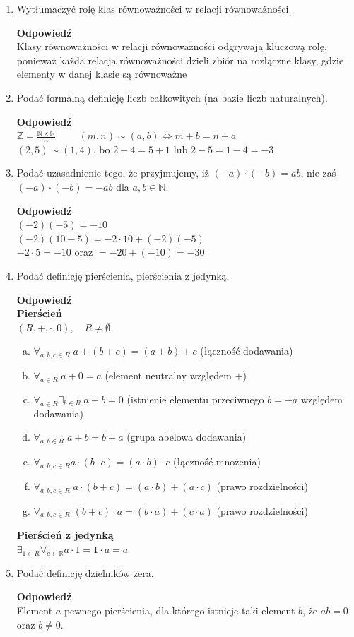 \documentclass[12pt,a4paper]{article}
\theoremstyle{break}
\newcommand{\Odp}[1]{
		\begin{mdframed}[style=zadanie]
			\textbf{Odpowiedź}\\
			#1
		\end{mdframed}
	}
\begin{document}
\begin{enumerate}[1.]
	\item Wytłumaczyć rolę klas równoważności w relacji równoważności.
	\Odp{
	Klasy równoważności w relacji równoważności odgrywają kluczową rolę, ponieważ każda relacja równoważności dzieli zbiór na rozłączne klasy, gdzie elementy w danej klasie są równoważne
	}
	
	\item Podać formalną definicję liczb całkowitych (na bazie liczb naturalnych).
	\Odp{
	$\mathbb{Z}=\frac{\mathbb{N}\times\mathbb{N}}{\sim} \qquad$
	$(m,n)\sim (a,b) \Leftrightarrow m+b = n+a$\\
	$(2,5)\sim (1,4)$, bo $2+4=5+1$ lub $2-5=1-4=-3$
	}
	
	\item Podać uzasadnienie tego, że przyjmujemy, iż $(-a)\cdot(-b) = ab$, nie zaś $(-a)\cdot(-b) = -ab$ dla $a, b \in \mathbb{N}$.
	\Odp{
	$(-2)(-5)=-10$\\
	$(-2)(10-5)=-2\cdot10+(-2)(-5)$\\
	$-2\cdot5=-10$ oraz $=-20+(-10)=-30$
	}
	
	\item Podać definicję pierścienia, pierścienia z jedynką.
	\Odp{
		\textbf{Pierścień}\\
		$(R,+,\cdot,0), \quad R\neq\emptyset$
		\begin{enumerate}[a)]
			\item $\forall_{a,b,c\in R}\; a+(b+c)=(a+b)+c$ (łączność dodawania)
			\item $\forall_{a\in R}\; a+0=a$ (element neutralny względem $+$)
			\item $\forall_{a\in R} \exists_{b\in R}\; a+b=0$ (istnienie elementu przeciwnego $b=-a$ względem dodawania)
			\item $\forall_{a,b\in R}\; a+b=b+a$ (grupa abelowa dodawania)
			\item $\forall_{a,b,c\in R} a\cdot(b\cdot c)=(a\cdot b)\cdot c$ (łączność mnożenia)
			\item $\forall_{a,b,c\in R} \; a\cdot(b+c)=(a\cdot b)+ (a\cdot c)$ (prawo rozdzielności)
			\item $\forall_{a,b,c\in R} \; (b+c)\cdot a= (b\cdot a) + (c\cdot a)$ (prawo rozdzielności)
		\end{enumerate}
		
		\textbf{Pierścień z jedynką}\\
		$\exists_{1\in R} \forall_{a\in\mathbb{R}} a\cdot1=1\cdot a=a$
	}
	
	\item Podać definicję dzielników zera.
	\Odp{
		Element $a$ pewnego pierścienia, dla którego istnieje taki element $b$, że $ab=0$ oraz $b\neq 0$.
	}
	

\end{enumerate}
\end{document}

